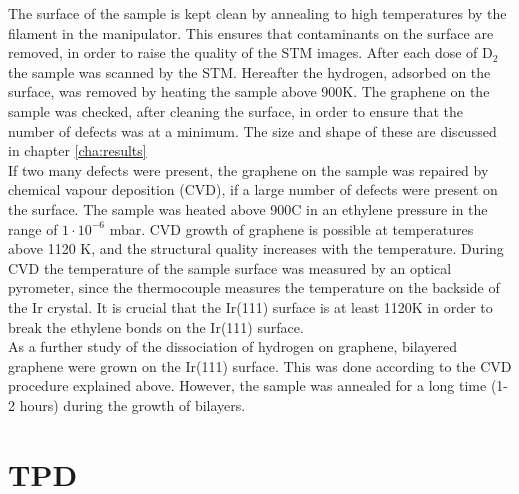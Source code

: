 The surface of the sample is kept clean by annealing to high temperatures by the filament in the manipulator. This ensures that contaminants on the surface are removed, in order to raise the quality of the STM images. After each dose of D$_2$ the sample was scanned by the STM. Hereafter the hydrogen, adsorbed on the surface, was removed by heating the sample above 900K. The graphene on the sample was checked, after cleaning the surface, in order to ensure that the number of defects was at a minimum. The size and shape of these are discussed in chapter \ref{cha:results}\\
If two many defects were present, the graphene on the sample was repaired by chemical vapour deposition (CVD), if a large number of defects were present on the surface. The sample was heated above 900\degree C in an ethylene pressure in the range of $1\cdot 10^{-6}$ mbar. CVD growth of graphene is possible at temperatures above 1120 K, and the structural quality increases with the temperature.\cite{1367-2630-11-2-023006} During CVD the temperature of the sample surface was measured by an optical pyrometer, since the thermocouple measures the temperature on the backside of the Ir crystal. It is crucial that the Ir(111) surface is at least 1120K in order to break the ethylene bonds on the Ir(111) surface.\\
As a further study of the dissociation of hydrogen on graphene, bilayered graphene were grown on the Ir(111) surface. This was done according to the CVD procedure explained above. However, the sample was annealed for a long time (1-2 hours) during the growth of bilayers.

\section{TPD}

